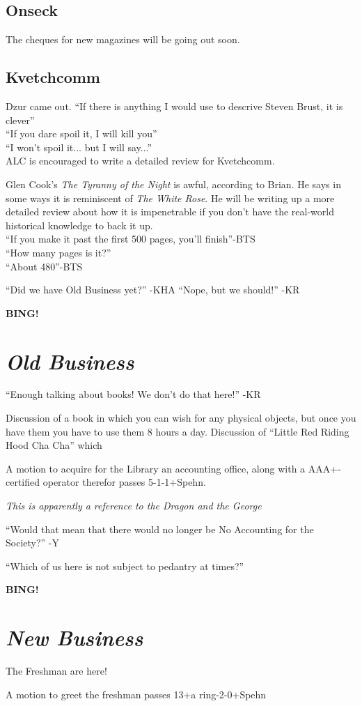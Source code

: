 \documentclass[10pt]{article}
\newcommand{\bing}{{\bf BING!} }
\newcommand{\goto}[1]{\bing \vskip 12pt \section*{{\em{#1}}}}
\begin{document}
\subsection*{Onseck}
The cheques for new magazines will be going out soon.

\subsection*{Kvetchcomm}
Dzur came out. ``If there is anything I would use to descrive Steven
Brust, it is clever''\\
``If you dare spoil it, I will kill you''\\
``I won't spoil it... but I will say...''\\
ALC is encouraged to write a detailed review for Kvetchcomm.


Glen Cook's  \emph{The Tyranny of the Night} is awful, according to
Brian. He says in some ways it is reminiscent of \emph{The White
  Rose}.  He will be writing up a more detailed review about how it is
impenetrable if you don't have the real-world historical knowledge to
back it up.  \\
``If you make it past the first 500 pages, you'll finish''-BTS\\
``How many pages is it?''\\
``About 480''-BTS


``Did we have Old Business yet?'' -KHA
``Nope, but we should!'' -KR

\goto{Old Business}

``Enough talking about books! We don't do that here!'' -KR

Discussion of a book in which you can wish for any physical objects,
but once you have them you have to use them 8 hours a day.
Discussion of ``Little Red Riding Hood Cha Cha'' which 

A motion to acquire for the Library an accounting office, along with a
AAA+-certified operator therefor passes 5-1-1+Spehn.

\emph{This is apparently a reference to the Dragon and the George}

``Would that mean that there would no longer be No Accounting for the
  Society?'' -Y

``Which of us here is not subject to pedantry at times?''

\goto{New Business}
The Freshman are here!

A motion to greet the freshman passes 13+a ring-2-0+Spehn
\end{document}

